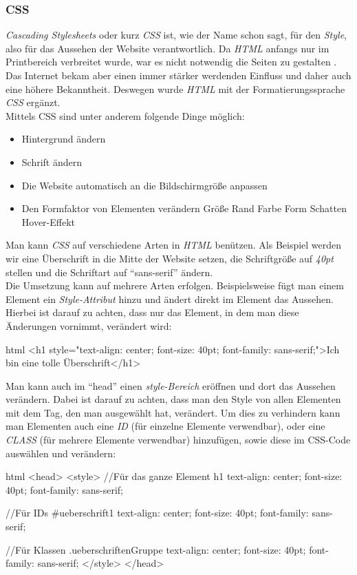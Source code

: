 		\subsubsection{CSS}
		\textit{Cascading Stylesheets} oder kurz \textit{CSS} ist, wie der Name schon sagt, für den \textit{Style}, also für das Aussehen der Website verantwortlich. Da \textit{HTML} anfangs nur im Printbereich verbreitet wurde, war es nicht notwendig die Seiten zu gestalten \cite{html5-css3-def, html5-css3-handbuch}. Das Internet bekam aber einen immer stärker werdenden Einfluss und daher auch eine höhere Bekanntheit. Deswegen wurde \textit{HTML} mit der Formatierungssprache \textit{CSS} ergänzt.\\
		Mittels CSS sind unter anderem folgende Dinge möglich:
		\begin{itemize}
			\item Hintergrund ändern
			\item Schrift ändern
			\item Die Website automatisch an die Bildschirmgröße anpassen
			\item Den Formfaktor von Elementen verändern
			\subitem Größe
			\subitem Rand
			\subitem Farbe
			\subitem Form
			\subitem Schatten
			\subitem Hover-Effekt
		\end{itemize}
		Man kann \textit{CSS} auf verschiedene Arten in \textit{HTML} benützen. Als Beispiel werden wir eine Überschrift in die Mitte der Website setzen, die Schriftgröße auf \textit{40pt} stellen und die Schriftart auf \enquote{sans-serif} ändern.\\
		Die Umsetzung kann auf mehrere Arten erfolgen. Beispielsweise fügt man einem Element ein \textit{Style-Attribut} hinzu und ändert direkt im Element das Aussehen. Hierbei ist darauf zu achten, dass nur das Element, in dem man diese Änderungen vornimmt, verändert wird:
		\begin{code}{html}
			<h1 style="text-align: center; font-size: 40pt; font-family: sans-serif;">Ich bin eine tolle Überschrift</h1>
		\end{code}
		Man kann auch im \enquote{head} einen \textit{style-Bereich} eröffnen und dort das Aussehen verändern. Dabei ist darauf zu achten, dass man den Style von allen Elementen mit dem Tag, den man ausgewählt hat, verändert. Um dies zu verhindern kann man Elementen auch eine \textit{ID} (für einzelne Elemente verwendbar), oder eine \textit{CLASS} (für mehrere Elemente verwendbar) hinzufügen, sowie diese im CSS-Code auswählen und verändern:
		\begin{code}{html}
				<head>
					<style>
					//Für das ganze Element
					h1 {
						text-align: center; 
						font-size: 40pt; 
						font-family: sans-serif;
					}
				
					//Für IDs
					#ueberschrift1 {
						text-align: center; 
						font-size: 40pt; 
						font-family: sans-serif;
					}
					
					//Für Klassen
					.ueberschriftenGruppe {
						text-align: center; 
						font-size: 40pt; 
						font-family: sans-serif;
					}
					</style>
				</head>
		\end{code}
